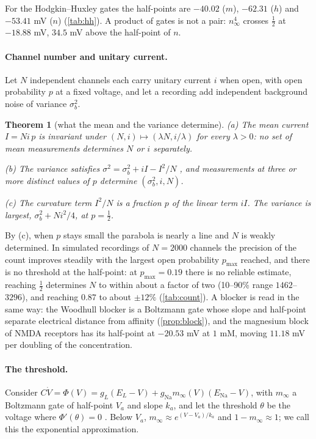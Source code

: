 \documentclass[11pt]{article}
\newtheorem{theorem}{Theorem}
\theoremstyle{definition}\newtheorem{definition}[theorem]{Definition}
\theoremstyle{remark}\newtheorem{remark}[theorem]{Remark}
\begin{document}
For the Hodgkin--Huxley gates the half-points are $-40.02$ ($m$), $-62.31$ ($h$) and $-53.41$ mV ($n$) (\cref{tab:hh}). A product of gates is not a pair: $n_\infty^4$ crosses $\frac12$ at $-18.88$ mV, $34.5$ mV above the half-point of $n$.

\paragraph{Channel number and unitary current.} Let $N$ independent channels each carry unitary current $i$ when open, with open probability $p$ at a fixed voltage, and let a recording add independent background noise of variance $\sigma_b^2$.

\begin{theorem}[what the mean and the variance determine]\label{thm:ident}
(a) The mean current $I=Ni\,p$ is invariant under $(N,i)\mapsto(\lambda N,i/\lambda)$ for every $\lambda>0$: no set of mean measurements determines $N$ or $i$ separately.
\par\noindent(b) The variance satisfies $\sigma^2=\sigma_b^2+iI-I^2/N$ \cite{Sigworth,NeherStevens}, and measurements at three or more distinct values of $p$ determine $(\sigma_b^2,i,N)$.
\par\noindent(c) The curvature term $I^2/N$ is a fraction $p$ of the linear term $iI$. The variance is largest, $\sigma_b^2+Ni^2/4$, at $p=\frac12$.
\end{theorem}

By (c), when $p$ stays small the parabola is nearly a line and $N$ is weakly determined. In simulated recordings of $N=2000$ channels the precision of the count improves steadily with the largest open probability $p_{\max}$ reached, and there is no threshold at the half-point: at $p_{\max}=0.19$ there is no reliable estimate, reaching $\frac12$ determines $N$ to within about a factor of two (10--90\% range $1462$--$3296$), and reaching $0.87$ to about $\pm12\%$ (\cref{tab:count}). A blocker is read in the same way: the Woodhull blocker is a Boltzmann gate whose slope and half-point separate electrical distance from affinity (\cref{prop:block}), and the magnesium block of NMDA receptors has its half-point at $-20.53$ mV at $1$ mM, moving $11.18$ mV per doubling of the concentration.

\paragraph{The threshold.} Consider $C\dot V=\Phi(V)=g_L(E_L-V)+g_\mathrm{Na}m_\infty(V)(E_\mathrm{Na}-V)$, with $m_\infty$ a Boltzmann gate of half-point $V_a$ and slope $k_a$, and let the threshold $\theta$ be the voltage where $\Phi'(\theta)=0$ \cite{PB}. Below $V_a$, $m_\infty\approx e^{(V-V_a)/k_a}$ and $1-m_\infty\approx1$; we call this the exponential approximation.
\end{document}
